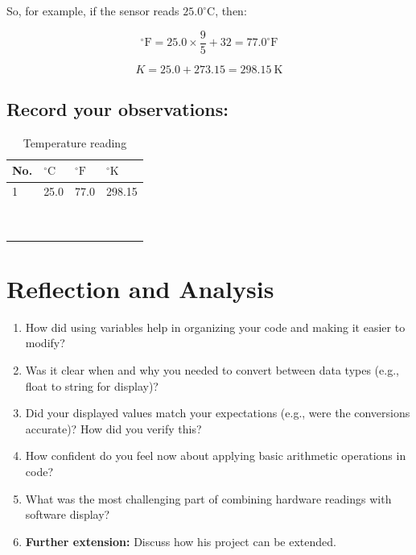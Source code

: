 \documentclass[a4paper,11pt]{article}
\begin{document}
So, for example, if the sensor reads \(25.0^\circ\text{C}\), then:

$$
^\circ\text{F} = 25.0 \times \frac{9}{5} + 32 = 77.0^\circ\text{F}
$$

$$
K = 25.0 + 273.15 = 298.15\ \text{K}
$$

\subsection*{Record your observations:}

\begin{table}[ht]
  \centering
  \renewcommand{\arraystretch}{1.5}
  \begin{tabular}{|p{1cm}|p{3cm}|p{3cm}|p{3cm}|}
    \hline
    \textbf{No.} & \textbf{\(^\circ\text{C}\)} & \textbf{\(^\circ\text{F}\)} & \textbf{\(^\circ\text{K}\)} \\ \hline
    1 & 25.0 & 77.0 & 298.15 \\ \hline
     &  &  &  \\ \hline
     &  &  &  \\ \hline
     &  &  &  \\ \hline
     &  &  &  \\ \hline
     &  &  &  \\ \hline
     &  &  &  \\ \hline
     &  &  &  \\ \hline
     &  &  &  \\ \hline
     &  &  &  \\ \hline
  \end{tabular}
  \caption{Temperature reading}
  \label{tab:4x10}
\end{table}


\newpage
\section*{Reflection and Analysis}
\begin{enumerate}
    \item How did using variables help in organizing your code and making it easier to modify?

\item Was it clear when and why you needed to convert between data types (e.g., float to string for display)?

\item Did your displayed values match your expectations (e.g., were the conversions accurate)? How did you verify this?

\item How confident do you feel now about applying basic arithmetic operations in code?

\item What was the most challenging part of combining hardware readings with software display?

    \item \textbf{Further extension:} Discuss how his project can be extended.

\end{enumerate}
\end{document}

